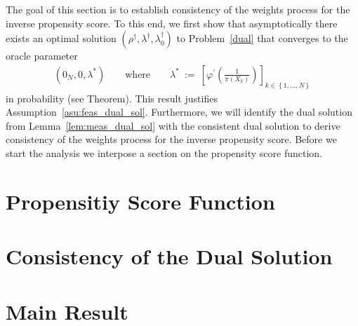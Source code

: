 The goal of this section is to establish consistency of the
weights process for the inverse propensity score.
To this end,
we first show that asymptotically there exists an optimal solution 
$
(\rho^\dagger,\lambda^\dagger,\lambda_0^\dagger)
$
to Problem~\ref{dual} that converges to the oracle parameter
\begin{align*}
  (0_N,0,\lambda^*)
  \qquad
  \text{where}
  \qquad
  \lambda^*
  \ 
  :=
  \ 
\left[ 
\varphi^{'} \left( \frac{1}{\pi(X_k)} \right)
\right]_{k\in \left\{ 1,\ldots,N \right\}}
\end{align*}
in probability (see Theorem).
This result justifies Assumption~\ref{asu:feas_dual_sol}.
Furthermore, we will identify the dual solution from Lemma~\ref{lem:meas_dual_sol} 
with the consistent dual solution to derive consistency of the weights process for the inverse propensity score.
Before we start the analysis we interpose a section on the propensity score function.
\section{Propensitiy Score Function}
  
\section{Consistency of the Dual Solution}
  
\section{Main Result}



